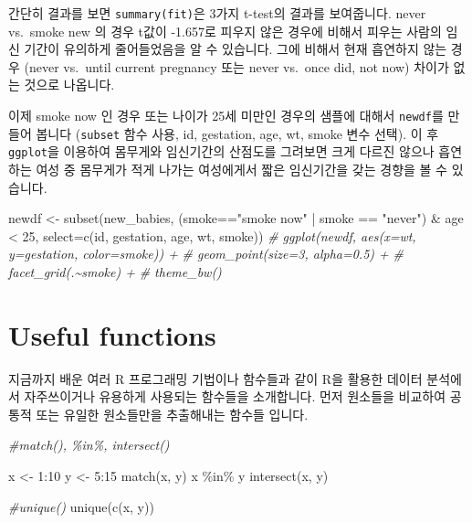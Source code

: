 \documentclass[
]{book}
\newenvironment{Shaded}{\begin{snugshade}}{\end{snugshade}}
\newcommand{\AttributeTok}[1]{\textcolor[rgb]{0.77,0.63,0.00}{#1}}
\newcommand{\CommentTok}[1]{\textcolor[rgb]{0.56,0.35,0.01}{\textit{#1}}}
\newcommand{\DecValTok}[1]{\textcolor[rgb]{0.00,0.00,0.81}{#1}}
\newcommand{\FunctionTok}[1]{\textcolor[rgb]{0.00,0.00,0.00}{#1}}
\newcommand{\NormalTok}[1]{#1}
\newcommand{\OtherTok}[1]{\textcolor[rgb]{0.56,0.35,0.01}{#1}}
\newcommand{\SpecialCharTok}[1]{\textcolor[rgb]{0.00,0.00,0.00}{#1}}
\newcommand{\StringTok}[1]{\textcolor[rgb]{0.31,0.60,0.02}{#1}}
\begin{document}
간단히 결과를 보면 \texttt{summary(fit)}은 3가지 t-test의 결과를 보여줍니다. never vs.~smoke new 의 경우 t값이 -1.657로 피우지 않은 경우에 비해서 피우는 사람의 임신 기간이 유의하게 줄어들었음을 알 수 있습니다. 그에 비해서 현재 흡연하지 않는 경우 (never vs.~until current pregnancy 또는 never vs.~once did, not now) 차이가 없는 것으로 나옵니다.

이제 smoke now 인 경우 또는 나이가 25세 미만인 경우의 샘플에 대해서 \texttt{newdf}를 만들어 봅니다 (\texttt{subset} 함수 사용, id, gestation, age, wt, smoke 변수 선택). 이 후 \texttt{ggplot}을 이용하여 몸무게와 임신기간의 산점도를 그려보면 크게 다르진 않으나 흡연하는 여성 중 몸무게가 적게 나가는 여성에게서 짧은 임신기간을 갖는 경향을 볼 수 있습니다.

\begin{Shaded}
\begin{Highlighting}[]

\NormalTok{newdf }\OtherTok{\textless{}{-}} \FunctionTok{subset}\NormalTok{(new\_babies, (smoke}\SpecialCharTok{==}\StringTok{"smoke now"} \SpecialCharTok{|}\NormalTok{ smoke }\SpecialCharTok{==} \StringTok{"never"}\NormalTok{) }\SpecialCharTok{\&}\NormalTok{ age }\SpecialCharTok{\textless{}} \DecValTok{25}\NormalTok{, }\AttributeTok{select=}\FunctionTok{c}\NormalTok{(id, gestation, age, wt, smoke))}
\CommentTok{\# ggplot(newdf, aes(x=wt, y=gestation, color=smoke)) +}
\CommentTok{\#   geom\_point(size=3, alpha=0.5) +}
\CommentTok{\#   facet\_grid(.\textasciitilde{}smoke) + }
\CommentTok{\#   theme\_bw()}
\end{Highlighting}
\end{Shaded}

\hypertarget{useful-functions-1}{%
\section{Useful functions}\label{useful-functions-1}}

지금까지 배운 여러 R 프로그래밍 기법이나 함수들과 같이 R을 활용한 데이터 분석에서 자주쓰이거나 유용하게 사용되는 함수들을 소개합니다. 먼저 원소들을 비교하여 공통적 또는 유일한 원소들만을 추출해내는 함수들 입니다.

\begin{Shaded}
\begin{Highlighting}[]
\CommentTok{\#match(), \%in\%, intersect()}

\NormalTok{x }\OtherTok{\textless{}{-}} \DecValTok{1}\SpecialCharTok{:}\DecValTok{10}
\NormalTok{y }\OtherTok{\textless{}{-}} \DecValTok{5}\SpecialCharTok{:}\DecValTok{15}
\FunctionTok{match}\NormalTok{(x, y)}
\NormalTok{x }\SpecialCharTok{\%in\%}\NormalTok{ y}
\FunctionTok{intersect}\NormalTok{(x, y)}

\CommentTok{\#unique()}
\FunctionTok{unique}\NormalTok{(}\FunctionTok{c}\NormalTok{(x, y))}
\end{Highlighting}
\end{Shaded}
\end{document}
